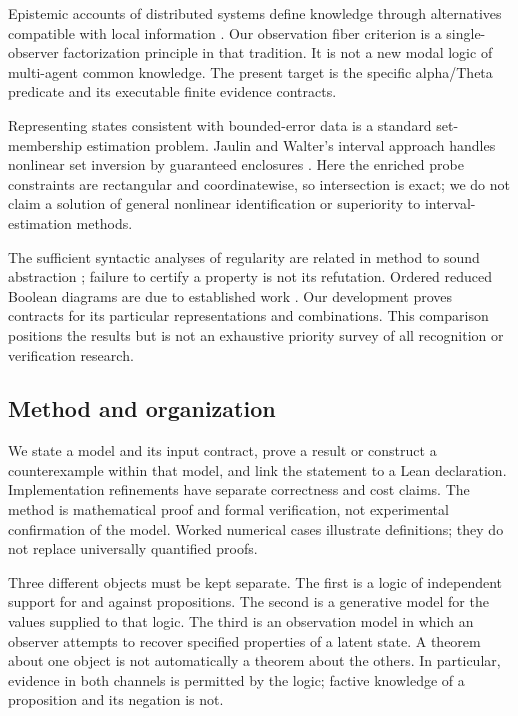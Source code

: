 \documentclass[11pt,a4paper]{article}
\begin{document}
Epistemic accounts of distributed systems define knowledge through alternatives
compatible with local information \cite{halpern1990knowledge}. Our observation
fiber criterion is a single-observer factorization principle in that tradition.
It is not a new modal logic of multi-agent common knowledge. The present target
is the specific alpha/Theta predicate and its executable finite evidence contracts.

Representing states consistent with bounded-error data is a standard
set-membership estimation problem. Jaulin and Walter's interval approach
handles nonlinear set inversion by guaranteed enclosures
\cite{jaulin1993inversion}. Here the enriched probe constraints are rectangular
and coordinatewise, so intersection is exact; we do not claim a solution of
general nonlinear identification or superiority to interval-estimation methods.

The sufficient syntactic analyses of regularity are related in method to
sound abstraction \cite{cousot1977abstract}; failure to certify a property is
not its refutation. Ordered reduced Boolean diagrams are due to established
work \cite{bryant1986graph}. Our development proves contracts for its particular
representations and combinations. This comparison positions the results but
is not an exhaustive priority survey of all recognition or verification research.

\subsection{Method and organization}
We state a model and its input contract, prove a result or construct a
counterexample within that model, and link the statement to a Lean declaration.
Implementation refinements have separate correctness and cost claims.
The method is mathematical proof and formal verification, not experimental
confirmation of the model. Worked numerical cases illustrate definitions;
they do not replace universally quantified proofs.

Three different objects must be kept separate. The first is a logic of
independent support for and against propositions. The second is a generative
model for the values supplied to that logic. The third is an observation model
in which an observer attempts to recover specified properties of a latent
state. A theorem about one object is not automatically a theorem about the
others. In particular, evidence in both channels is permitted by the logic;
factive knowledge of a proposition and its negation is not.
\end{document}
